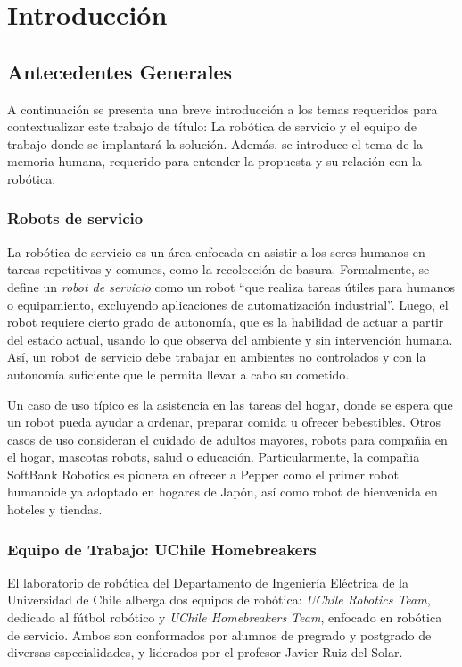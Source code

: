 
\chapter{Introducci\'on}

\section{Antecedentes Generales}

A continuaci\'on se presenta una breve introducci\'on a los temas requeridos para contextualizar este trabajo de t\'itulo: La rob\'otica de servicio y el equipo de trabajo donde se implantar\'a la soluci\'on. Adem\'as, se introduce el tema de la memoria humana, requerido para entender la propuesta y su relaci\'on con la rob\'otica.


\subsection{Robots de servicio}

La rob\'otica de servicio es un \'area enfocada en asistir a los seres humanos en tareas repetitivas y comunes, como la recolecci\'on de basura. Formalmente, se define un \textit{robot de servicio} como un robot ``que realiza tareas \'utiles para humanos o equipamiento, excluyendo aplicaciones de automatizaci\'on industrial''\cite{IFR}. Luego, el robot requiere cierto grado de autonom\'ia, que es la habilidad de actuar a partir del estado actual, usando lo que observa del ambiente y sin intervenci\'on humana. As\'i, un robot de servicio debe trabajar en ambientes no controlados y con la autonom\'ia suficiente que le permita llevar a cabo su cometido.

Un caso de uso t\'ipico es la asistencia en las tareas del hogar, donde se espera que un robot pueda ayudar a ordenar, preparar comida u ofrecer bebestibles. Otros casos de uso consideran el cuidado de adultos mayores, robots para compa\~nia en el hogar, mascotas robots, salud o educaci\'on. Particularmente, la compa\~nia SoftBank Robotics es pionera en ofrecer a Pepper como el primer robot humanoide ya adoptado en hogares de Jap\'on, as\'i como robot de bienvenida en hoteles y tiendas\cite{softbank}.


\subsection{Equipo de Trabajo: UChile Homebreakers}

El laboratorio de rob\'otica del Departamento de Ingenier\'ia El\'ectrica de la Universidad de Chile alberga dos equipos de rob\'otica: \textit{UChile Robotics Team}, dedicado al f\'utbol rob\'otico y \textit{UChile Homebreakers Team}, enfocado en rob\'otica de servicio. Ambos son conformados por alumnos de pregrado y postgrado de diversas especialidades, y liderados por el profesor Javier Ruiz del Solar\cite{uchile-robotics}.

